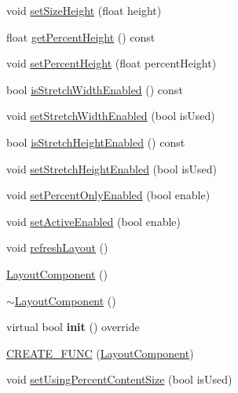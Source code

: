 \begin{DoxyCompactItemize}
\item 
void \hyperlink{classui_1_1LayoutComponent_a88bc0e190fff80351071bbeceea9045f}{set\+Size\+Height} (float height)
\item 
float \hyperlink{classui_1_1LayoutComponent_a45a619b652e86c0f3181dec2adba6954}{get\+Percent\+Height} () const
\item 
void \hyperlink{classui_1_1LayoutComponent_a6533514d789f5edb4c67c11bb7b45770}{set\+Percent\+Height} (float percent\+Height)
\item 
bool \hyperlink{classui_1_1LayoutComponent_abb95d248959215652769fb5db602ded1}{is\+Stretch\+Width\+Enabled} () const
\item 
void \hyperlink{classui_1_1LayoutComponent_a85301b7c5ca5edf04c2d1c30ac925e5e}{set\+Stretch\+Width\+Enabled} (bool is\+Used)
\item 
bool \hyperlink{classui_1_1LayoutComponent_ac380d08f28b0816cc1f2b4bc24be4123}{is\+Stretch\+Height\+Enabled} () const
\item 
void \hyperlink{classui_1_1LayoutComponent_a65abc1aa634d8acc866c0be757ae17a9}{set\+Stretch\+Height\+Enabled} (bool is\+Used)
\item 
void \hyperlink{classui_1_1LayoutComponent_a8ccc6b1eed66db106bb11906244aad89}{set\+Percent\+Only\+Enabled} (bool enable)
\item 
void \hyperlink{classui_1_1LayoutComponent_a781f5c70717d610553e5be7ece0b392f}{set\+Active\+Enabled} (bool enable)
\item 
void \hyperlink{classui_1_1LayoutComponent_a71d6fd230951a624210a0501033a9c56}{refresh\+Layout} ()
\item 
\hyperlink{classui_1_1LayoutComponent_ab67f1d89a3f62b9acd30506ef6635cba}{Layout\+Component} ()
\item 
\hyperlink{classui_1_1LayoutComponent_a6e3325f4c64c5c7e48900b03e706ecac}{$\sim$\+Layout\+Component} ()
\item 
\mbox{\label{classui_1_1LayoutComponent_acfcc5ef1e41bd2eb1ff8cba818c01755}} 
virtual bool {\bfseries init} () override
\item 
\hyperlink{classui_1_1LayoutComponent_ae8c296aa496ccf281461adba27a9955f}{C\+R\+E\+A\+T\+E\+\_\+\+F\+U\+NC} (\hyperlink{classui_1_1LayoutComponent}{Layout\+Component})
\item 
void \hyperlink{classui_1_1LayoutComponent_a1b647bfd14f2c29fd9790e0aa753bf26}{set\+Using\+Percent\+Content\+Size} (bool is\+Used)
\item 

\end{DoxyCompactItemize}
